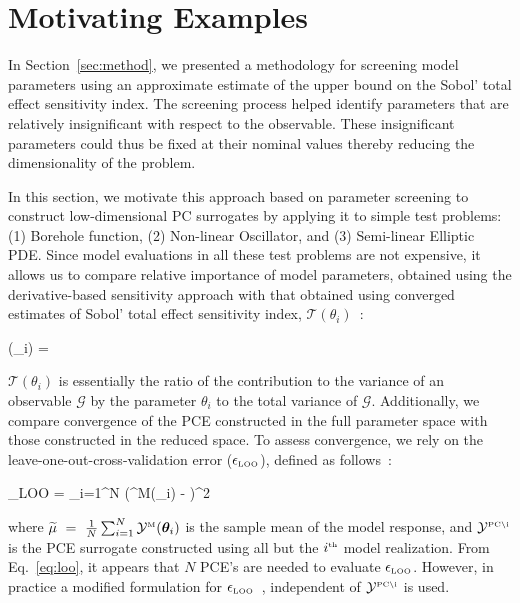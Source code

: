\section{Motivating Examples}
\label{sec:examples}

In Section~\ref{sec:method}, we presented a methodology for screening model
parameters using an approximate estimate of the upper bound on the Sobol'
total effect sensitivity index. The screening process helped identify parameters
that are relatively insignificant with respect to the observable. These insignificant
parameters could thus be fixed at their nominal values thereby reducing the
dimensionality of the problem. 

In this section, we motivate this approach based
on parameter screening to construct low-dimensional PC surrogates by 
applying it to simple test problems: (1) Borehole function, (2) Non-linear Oscillator, and
(3) Semi-linear Elliptic PDE. Since model evaluations in all these test
problems are not expensive, it allows us to compare relative importance of
model parameters,
obtained using the derivative-based sensitivity approach with that obtained
using converged estimates of Sobol' total effect sensitivity index, $\mathcal{T}(\theta_i)$~\cite{Sobol:2001}:

\be
{}(\theta_i) = 
\ee

\noindent $\mathcal{T}(\theta_i)$ is essentially the ratio of the contribution to the variance of an
observable $\mathcal{G}$ by the parameter $\theta_i$ to the total variance of $\mathcal{G}$.
Additionally, we compare convergence of the PCE constructed in
the full parameter space with those constructed in the reduced space. To assess convergence, 
we rely on the 
leave-one-out-cross-validation error ($\epsilon_{\mbox{\tiny LOO}}$), defined
as follows~\cite{Blatman:2010}:

\be
\epsilon_{\mbox{\tiny LOO}} = 
{\sum_{i=1}^N
\left(^{\mbox{\tiny M}}(\bm{\theta}_i) - \widetilde{\mu}\right)^2}
\label{eq:loo}
\ee

\noindent where $\widetilde{\mu}~=~\frac{1}{N}\sum_{i=1}^N \mathcal{Y}^{\mbox{\tiny M}}(\bm{\theta}_i)$
is the sample mean of the model response, and $ \mathcal{Y}^{\mbox{\tiny {PC}\textbackslash i}}$
is the PCE surrogate constructed using all but the $i^{\mbox{\tiny{th}}}$ model realization. 
From Eq.~\ref{eq:loo}, it appears that $N$ PCE's are needed to evaluate $\epsilon_{\mbox{\tiny LOO}}$.
However, in practice a modified formulation for $\epsilon_{\mbox{\tiny LOO}}$~\cite{Blatman:2009},
independent of $\mathcal{Y}^{\mbox{\tiny {PC}\textbackslash i}}$ is used.

